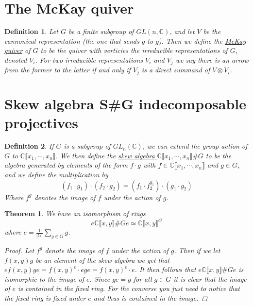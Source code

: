 \documentclass[11pt, a4paper, english]{article}
\newtheorem*{theorem}{Theorem}
\newtheorem*{defin}{Definition}
\newcommand{\C}{\mathbb{C}}
\begin{document}
\section*{The McKay quiver}
\begin{defin}
Let $G$ be a finite subgroup of $GL(n, \C)$, and let $V$ be the cannonical representation (the one that sends $g$ to $g$). Then we define the \underline{McKay quiver} of $G$ to be the quiver with verticies the irreducible representations of $G$, denoted $V_i$. For two irreducible representations $V_i$ and $V_j$ we say there is an arrow from the former to the latter if and only if $V_j$ is a direct summand of $V \otimes V_i$. 
\end{defin}

\section*{Skew algebra S\#G indecomposable projectives}
\begin{defin}
If $G$ is a subgroup of $GL_n(\C)$, we can extend the group action of $G$ to $\C\llbracket x_1, \cdots, x_n\rrbracket$. We then define the \underline{skew algebra $\C \llbracket x_1, \cdots, x_n \rrbracket \# G$} to be the algebra generated by elements of the form $f \cdot g$ with $f \in \C\llbracket x_1, \cdots, x_n\rrbracket$ and $g \in G$, and we define the multiplication by
$$ (f_1 \cdot g_1) \cdot (f_2 \cdot g_2) = (f_1 \cdot f_2^{g_1}) \cdot (g_1 \cdot g_2) $$
Where $f^g$ denotes the image of $f$ under the action of $g$.
\end{defin}

\begin{theorem}
We have an isomorphism of rings
$$ e \C\llbracket x, y \rrbracket \# G e \simeq \C\llbracket x, y \rrbracket^G $$
where $e = \frac{1}{|G|} \sum_{g \in G} g$.

\begin{proof}
Let $f^g$ denote the image of $f$ under the action of $g$. Then if we let $f(x,y)g$ be an element of the skew algebra we get that $e f(x,y)g e = f(x, y)^e \cdot ege = f(x, y)^e \cdot e$. It then follows that $  e \C\llbracket x, y\rrbracket \# G e$ is isomorphic to the image of $e$. Since $ge=g$ for all $g\in G$ it is clear that the image of $e$ is contained in the fixed ring. For the converse you just need to notice that the fixed ring is fixed under $e$ and thus is contained in the image.
\end{proof}
\end{theorem}
\end{document}
